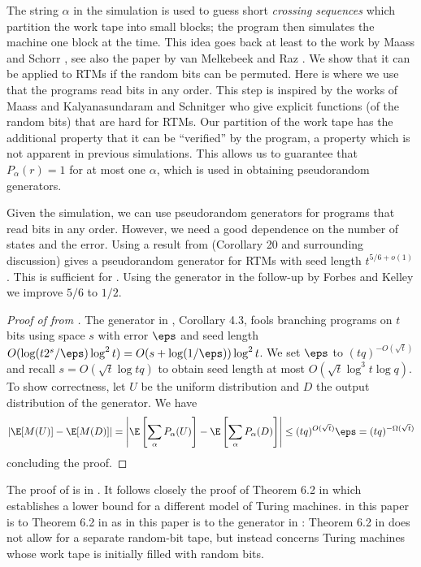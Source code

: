 The string $\alpha$ in the simulation is used to guess short \emph{crossing
sequences} which partition the work tape into small blocks; the program
then simulates the machine one block at the time. This idea goes back
at least to the work by Maass and Schorr \cite{MaS87}, see also the
paper by van Melkebeek and Raz \cite{DBLP:journals/tcs/MelkebeekR05}.
We show that it can be applied to RTMs if the random bits can be permuted.
Here is where we use that the programs read bits in any order. This
step is inspired by the works of Maass \cite{MR808746} and Kalyanasundaram
and Schnitger \cite{KalyanasundaramS92} who give explicit functions
(of the random bits) that are hard for RTMs. Our partition of the
work tape has the additional property that it can be ``verified''
by the program, a property which is not apparent in previous simulations.
This allows us to guarantee that $P_{\alpha}(r)=1$ for at most one
$\alpha$, which is used in obtaining pseudorandom generators.

\medskip

Given the simulation, we can use pseudorandom generators for programs
that read bits in any order. However, we need a good dependence on
the number of states and the error. Using a result from \cite{HLV-bipnfp}
(Corollary 20 and surrounding discussion) gives a pseudorandom generator
for RTMs with seed length $t^{5/6+o(1)}$. This is sufficient for
. Using the generator in the follow-up by
Forbes and Kelley \cite{ForbesKelley-2018} we improve $5/6$ to $1/2$.

%
%
%
%
%
%
%
\begin{proof}[Proof of  from
  ]  %
The generator in \cite{ForbesKelley-2018}, Corollary 4.3, fools branching
programs on $t$ bits using space $s$ with error $\eps$ and seed length
$O(\log(t2^{s}/\eps)\log^{2}t)=O(s+\log(1/\eps))\log^{2}t$. We set $\eps$
to $(tq)^{-O(\sqrt{t})}$ and recall $s=O(\sqrt{t}\log tq)$ to obtain
seed length at most $O(\sqrt{t}\log^{3}t\log q)$. To show correctness,
let $U$ be the uniform distribution and $D$ the output distribution
of the generator. We have
%
%
\[
\left|\E[M(U)]-\E[M(D)]\right|=
\left|\E\left[\sum_{\alpha}P_{\alpha}(U)\right]-
\E\left[\sum_{\alpha}P_{\alpha}(D)\right]\right|\le(tq)^{O(\sqrt{t})}\eps
%
=(tq)^{-\Omega(\sqrt{t})}   %
\]
concluding the proof.
%
%
%
%
\end{proof}
%
The proof of  is in .
It follows closely the proof of Theorem 6.2 in \cite{ViolaBPvsE}
which establishes a lower bound for a different model of Turing machines.
 in this paper is to Theorem 6.2 in \cite{ViolaBPvsE}
as  in this paper is to the generator in \cite{INW94}:
Theorem 6.2 in \cite{ViolaBPvsE} does not allow for a separate random-bit
tape, but instead concerns Turing machines whose work tape is initially
filled with random bits.

